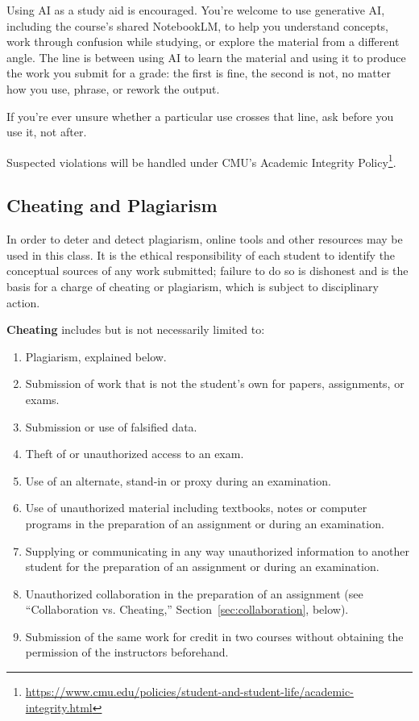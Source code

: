 Using AI as a study aid is encouraged. You're welcome to use generative AI, including the course's shared NotebookLM, 
to help you understand concepts, work through confusion while studying, or explore the material from a different angle. 
The line is between using AI to learn the material and using it to produce the work you submit for a grade:
 the first is fine, the second is not, no matter how you use, phrase, or rework the output.

If you're ever unsure whether a particular use crosses that line, ask before you use it, not after.

Suspected violations will be handled under CMU's Academic Integrity Policy\footnote{\url{https://www.cmu.edu/policies/student-and-student-life/academic-integrity.html}}.

\subsection{Cheating and Plagiarism}
In order to deter and detect plagiarism, online tools and other resources may be used in this class.
It is the ethical responsibility of each student to identify the conceptual sources of any work submitted; 
failure to do so is dishonest and is the basis for a charge of cheating or plagiarism, 
which is subject to disciplinary action.

\textbf{Cheating} includes but is not necessarily limited to:
\begin{enumerate}
\item Plagiarism, explained below.
\item Submission of work that is not the student's own for papers, assignments, or exams.
\item Submission or use of falsified data.
\item Theft of or unauthorized access to an exam.
\item Use of an alternate, stand-in or proxy during an examination.
\item Use of unauthorized material including textbooks, notes or computer programs in the preparation of an assignment or during an examination.
\item Supplying or communicating in any way unauthorized information to another student for the preparation of an assignment or during an examination.
\item  Unauthorized collaboration in the preparation of an assignment (see ``Collaboration vs. Cheating,'' Section~\ref{sec:collaboration}, below).
\item Submission of the same work for credit in two courses without obtaining the permission of the instructors beforehand.
\end{enumerate}

